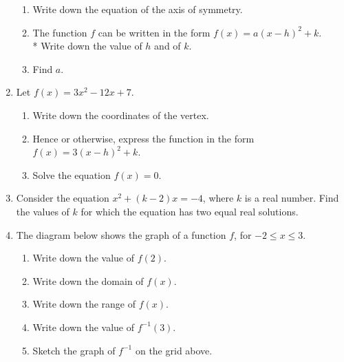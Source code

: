 \documentclass[12pt, oneside]{article}
\begin{document}
\begin{enumerate}
    \begin{enumerate}
        \item Write down the equation of the axis of symmetry.
        \item The function $f$ can be written in the form $f(x)=a(x-h)^2 +k$. \\*
        Write down the value of $h$ and of $k$.
        \item Find $a$.
    \end{enumerate}


\item Let $f(x)=3x^2-12x+7$.
\begin{enumerate}
    \item Write down the coordinates of the vertex.
    \item Hence or otherwise, express the function in the form $f(x)=3(x-h)^2 +k$.
    \item Solve the equation  $f(x)=0$.
\end{enumerate}

\item Consider the equation $x^2 + (k-2)x=-4$, where $k$ is a real number. Find the values of $k$ for which the equation has two equal real solutions.

\newpage

\item The diagram below shows the graph of a function $f$, for $-2 \leq x \leq 3$.

    \begin{center}
    \end{center}
  \begin{enumerate}
      \item Write down the value of $f(2)$.
      \item Write down the domain of $f(x)$.
      \item Write down the range of $f(x)$.
      \item Write down the value of $f^{-1}(3)$.
      \item Sketch the graph of $f^{-1}$ on the grid above.
  \end{enumerate}


\end{enumerate}
\end{document}
